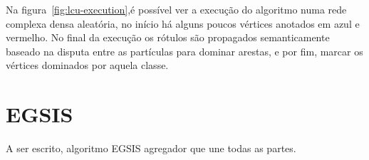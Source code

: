 \begin{figure}[!h]
\centering
    \captionsetup{width=14cm}

    \begin{subfigure}[b]{0.45\textwidth}
    \centering
    \caption{\label{fig:lcu-partial}}
    \end{subfigure}
\quad
    \begin{subfigure}[b]{0.45\textwidth}
    \centering
    \caption{\label{fig:lcu-done}}
    \end{subfigure}
    {\Fonte{\fonteautor}}
\quad
\end{figure}
\FloatBarrier{}


Na figura~\ref{fig:lcu-execution},é possível ver a execução do
algoritmo numa rede complexa densa aleatória, no início há alguns
poucos vértices anotados em azul e vermelho. No final da execução os
rótulos são propagados semanticamente baseado na disputa entre as
partículas para dominar arestas, e por fim, marcar os vértices
dominados por aquela classe.


\section{EGSIS}\label{sec:teorica-egsis}

A ser escrito, algoritmo \gls{EGSIS} agregador que une todas as partes.
